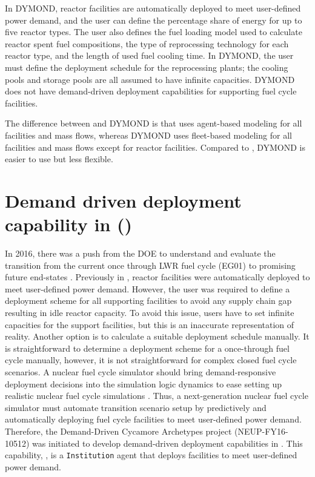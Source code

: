 In DYMOND, reactor facilities are automatically deployed to 
meet user-defined power demand, and the user can define 
the percentage share of energy for up to five reactor types. 
The user also defines the fuel loading model used to calculate 
reactor spent fuel compositions, the type of reprocessing 
technology for each reactor type, and the length 
of used fuel cooling time. 
In DYMOND, the user must define the deployment schedule for 
the reprocessing plants; the cooling pools and storage pools 
are all assumed to have infinite capacities. 
DYMOND does not have demand-driven deployment capabilities for 
supporting fuel cycle facilities. 

The difference between \Cyclus and DYMOND is that \Cyclus uses 
agent-based modeling for all facilities and mass flows, 
whereas DYMOND uses fleet-based modeling for all facilities and 
mass flows except for reactor facilities. 
Compared to \Cyclus, DYMOND is easier to use but less flexible. 

\section{Demand driven deployment capability in \Cyclus (\deploy)}
In 2016, there was a push from the DOE to understand and evaluate the 
transition from the current once through LWR fuel cycle (EG01) 
to promising future end-states \cite{feng_standardized_2016}.
Previously in \Cyclus, reactor facilities were automatically 
deployed to meet user-defined power demand. 
However, the user was required to define a deployment scheme for all 
supporting facilities to avoid any supply chain 
gap resulting in idle reactor capacity. 
To avoid this issue, users 
have to set infinite capacities for the support facilities, 
but this is an inaccurate representation of reality. 
Another option is to calculate a suitable deployment schedule manually.
It is straightforward to determine a deployment scheme for a once-through 
fuel cycle manually, however, it is not straightforward for complex 
closed fuel cycle scenarios.
A nuclear fuel cycle simulator should bring demand-responsive deployment decisions into 
the simulation logic dynamics to ease setting up realistic nuclear fuel cycle 
simulations \cite{huff_current_2017}. 
Thus, a next-generation nuclear fuel cycle simulator must automate 
transition scenario setup by predictively and 
automatically deploying fuel cycle facilities to meet user-defined 
power demand. 
Therefore, the Demand-Driven Cycamore Archetypes project
(NEUP-FY16-10512) was initiated to develop demand-driven deployment 
capabilities in \Cyclus.
This capability, \deploy, is a \Cyclus \texttt{Institution}
agent that deploys facilities to meet user-defined power demand. 

